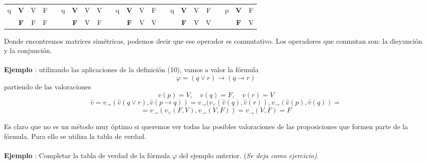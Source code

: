 \begin{table}[]
\begin{tabular}{ccccc|ccccc|ccccc|ccccc|ccc}
\multicolumn{1}{c|}{\multirow{2}{*}{q}} & \multicolumn{1}{c|}{\textbf{V}}   & V          & F          &  & \multicolumn{1}{c|}{\multirow{2}{*}{q}} & \multicolumn{1}{c|}{\textbf{V}} & V          & V          &  & \multicolumn{1}{c|}{\multirow{2}{*}{q}} & \multicolumn{1}{c|}{\textbf{V}}        & V          & F          &  & \multicolumn{1}{c|}{\multirow{2}{*}{q}} & \multicolumn{1}{c|}{\textbf{V}}            & V          & F          &  & \multicolumn{1}{c|}{\multirow{2}{*}{p}} & \multicolumn{1}{c|}{\textbf{V}} & F \\
\multicolumn{1}{c|}{}                   & \multicolumn{1}{c|}{\textbf{F}}   & F          & F          &  & \multicolumn{1}{c|}{}                   & \multicolumn{1}{c|}{\textbf{F}} & V          & F          &  & \multicolumn{1}{c|}{}                   & \multicolumn{1}{c|}{\textbf{F}}        & V          & V          &  & \multicolumn{1}{c|}{}                   & \multicolumn{1}{c|}{\textbf{F}}            & V          & V          &  & \multicolumn{1}{c|}{}                   & \multicolumn{1}{c|}{\textbf{F}} & V
\end{tabular}
\end{table}

Donde encontremos matrices simétricas, podemos decir que ese operador es conmutativo. Los operadores que conmutan son: la disyunción y la conjunción.
\paragraph{}
\addtocounter{ej}{1} %
\textbf{Ejemplo }: utilizando las aplicaciones de la definición (10), vamos a valor la fórmula 
\[ \varphi= (q \lor r) \rightarrow (q \rightarrow r) \]
partiendo de las valoraciones 
\[v(p)=V, \quad v(q)=F, \quad v(r)=V \]
\[ \widehat{v}= v_{\rightarrow}(\widehat{v}(q \lor r), \widehat{v}(p \rightarrow q)) =  v_{\rightarrow}(v_{\lor}(\widehat{v}(q), \widehat{v}(r)), v_{\rightarrow}(\widehat{v}(p), \widehat{v}(q))= \]
\[ =v_{\rightarrow}(v_{\lor}(F,V), v_{\rightarrow}(V,F))= v_{\rightarrow}(V,F)=F \]

Es claro que no es un método muy óptimo si queremos ver todas las posibles valoraciones de las proposiciones que formen parte de la fórmula. Para ello se utiliza la tabla de verdad. 
\paragraph{}
\addtocounter{ej}{1} %
\textbf{Ejemplo }: Completar la tabla de verdad de la fórmula $\varphi$ del ejemplo anterior. (\textit{Se deja como ejercicio)}.

